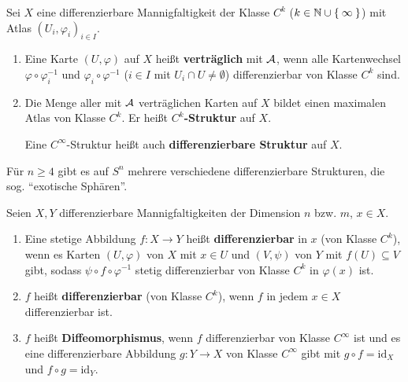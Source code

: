 \begin{definition}
    Sei $X$ eine differenzierbare Mannigfaltigkeit der Klasse $C^k$ 
    ($k \in \mathbb{N} \cup \Set{\infty}$) mit Atlas $(U_i, \varphi_i)_{i \in I}$.

    \begin{enumerate}[label=\alph*)]
        \item Eine Karte $(U, \varphi)$ auf $X$ heißt \textbf{verträglich}
              mit $\mathcal{A}$, wenn alle Kartenwechsel $\varphi \circ \varphi_i^{-1}$
              und $\varphi_i \circ \varphi^{-1}$ ($i \in I$ mit $U_i \cap U \neq \emptyset$)
              differenzierbar von Klasse $C^k$ sind.
        \item Die Menge aller mit $\mathcal{A}$ verträglichen Karten auf 
              $X$ bildet einen maximalen Atlas von Klasse $C^k$. Er
              heißt \textbf{$C^k$-Struktur} auf $X$.
            
              Eine $C^\infty$-Struktur heißt auch \textbf{differenzierbare Struktur}
              auf $X$.
    \end{enumerate}
\end{definition}

\begin{bemerkung}
    Für $n \geq 4$ gibt es auf $S^n$ mehrere verschiedene differenzierbare
    Strukturen, die sog. \enquote{exotische Sphären}.
\end{bemerkung}

\begin{definition}
    Seien $X, Y$ differenzierbare Mannigfaltigkeiten der Dimension
    $n$ bzw. $m$, $x \in X$.

    \begin{enumerate}[label=\alph*),ref=\theplaindefinition.\alph*]
        \item Eine stetige Abbildung $f:X \rightarrow Y$ heißt\label{def:stetigeAbbildungDiffbar}
              \textbf{differenzierbar}
              in $x$ (von Klasse $C^k$),
              wenn es Karten $(U, \varphi)$ von $X$ mit
              $x \in U$ und $(V, \psi)$ von $Y$ mit $f(U) \subseteq V$
              gibt, sodass $\psi \circ f \circ \varphi^{-1}$ stetig
              differenzierbar von Klasse $C^k$ in $\varphi(x)$ ist.
        \item $f$ heißt \textbf{differenzierbar}
              (von Klasse $C^k$), wenn $f$ in jedem $x \in X$ 
              differenzierbar ist.
        \item $f$ heißt \textbf{Diffeomorphismus},
              wenn $f$ differenzierbar von Klasse $C^\infty$ ist und
              es eine differenzierbare Abbildung $g: Y \rightarrow X$
              von Klasse $C^\infty$ gibt mit $g \circ f = \text{id}_X$
              und $f \circ g = \text{id}_Y$.
    \end{enumerate}
\end{definition}

